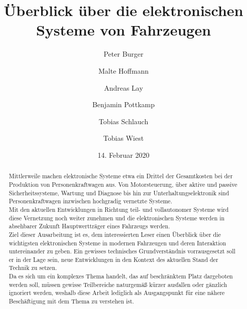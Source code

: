 \documentclass[]{article}
\title{Überblick über die elektronischen Systeme von Fahrzeugen}
\author{
	Peter Burger
	\and
	Malte Hoffmann
	\and
	Andreas Lay
	\and
	Benjamin Pottkamp
	\and
	Tobias Schlauch
	\and
	Tobias Wiest
}
\date{14. Februar 2020}
\begin{document}
\sloppy

\maketitle

\begin{abstract}
	Mittlerweile machen elektronische Systeme etwa ein Drittel der Gesamtkosten bei der Produktion von
	Personenkraftwagen aus. Von Motorsteuerung, über aktive und passive Sicherheitssysteme, 
	Wartung und Diagnose bis hin zur Unterhaltungselektronik sind Personenkraftwagen inzwischen hochgradig
	vernetzte Systeme. \cite{reif2011bosch}\\
	
	Mit den aktuellen Entwicklungen in Richtung teil- und vollautonomer Systeme wird diese Vernetzung noch weiter zunehmen 
	und die elektronischen Systeme werden in absehbarer Zukunft Hauptwertträger eines Fahrzeugs werden. \cite{BP02}\\
	
	Ziel dieser Ausarbeitung ist es, dem interessierten Leser einen Überblick über die wichtigsten elektronischen Systeme in
	modernen Fahrzeugen und deren Interaktion untereinander zu geben. Ein gewisses technisches Grundverständnis vorrausgesetzt 
	soll er in der Lage sein, neue Entwicklungen in den Kontext des aktuellen Stand der Technik zu setzen.\\
	
	Da es sich um ein komplexes Thema handelt, das auf beschränktem Platz dargeboten werden soll, müssen gewisse Teilbereiche naturgemäß
	kürzer ausfallen oder gänzlich ignoriert werden, weshalb diese Arbeit lediglich als Ausgangspunkt für eine nähere Beschäftigung mit dem Thema
	zu verstehen ist.
\end{abstract}
\newpage
\tableofcontents









\begingroup
\RaggedRight


\endgroup
\listoffigures


\end{document}
